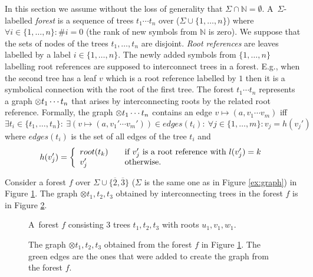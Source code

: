 \documentclass[a4paper, 12pt]{article}
\begin{document}
In this section we assume without the loss of generality that $\Sigma \cap \mathbb{N} = \emptyset$.
A~$\Sigma$-labelled \emph{forest} is a sequence of trees $t_1 \cdots t_n$ over ($\Sigma \cup \{1,\ldots,n\}$)
where $\forall i \in \{1,\ldots,n\}: \#i = 0$ (the rank of new symbols from $\mathbb{N}$ is zero).
We suppose that the sets of nodes of the trees $t_1, \ldots, t_n$ are disjoint.
\emph{Root references} are leaves labelled by a label $i \in \{1,\ldots,n\}$.
The newly added symbols from $\{1,\ldots,n\}$ labelling root references are
supposed to interconnect trees in a forest.
E.g., when the second tree has a leaf $v$ which is a root reference labelled by $1$
then it is a symbolical connection with the root of the first tree.
The forest $t_1 \cdots t_n$ represents a graph $\otimes t_1 \cdots t_n$ that arises
by interconnecting roots by the related root reference.
Formally, the graph $\otimes t_1 \cdots t_n$ contains an edge $v \mapsto (a,v_1 \cdots v_m)$ iff $\exists t_i \in \{t_1, \ldots, t_n\}:\ \exists(v \mapsto (a, v_1' \cdots v_m')) \in edges(t_i):
\ \forall j \in \{1,\ldots,m\}: v_j = h(v_j')$ where $edges(t_i)$ is the set of all edges of the tree $t_i$ and
\[ h(v_j') = \left\{
  \begin{array}{l l}
  root(t_k) & \quad \text{if $v_j'$ is a root reference with $l(v_j') = k$}\\
  v_j'   & \quad \text{otherwise.}
  \end{array} \right.\]

Consider a forest $f$ over $\Sigma \cup \{\overline{2}, \overline{3}\}$
($\Sigma$ is the same one as in Figure \ref{ex:graph}) in Figure \ref{fig:forest}.
The graph $\otimes t_1,t_2,t_3$ obtained by interconnecting trees in the forest $f$ is in Figure \ref{fig:forest_graph}.

	\begin{figure}[bth]
	\begin{center}
		\scalebox{1}
		{
			
			\hspace{0.55cm}
			
			\hspace{0.55cm}
			
		}
		\caption{A~forest $f$ consisting 3 trees $t_1, t_2, t_3$ with roots $u_1, v_1, w_1$.}
	  \label{fig:forest}
	\end{center}
	\end{figure}

	\begin{figure}[bth]
	\begin{center}
		
		\caption{The graph $\otimes t_1,t_2,t_3$ obtained from the forest $f$ in Figure \ref{fig:forest}.
		The green edges are the ones that were added to create the graph from the forest $f$.}
	  \label{fig:forest_graph}
	\end{center}
	\end{figure}
\vspace{-0.5cm}
\end{document}
